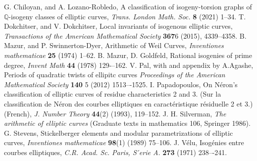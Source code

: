 \documentclass{ws-ijnt}
\newcommand{\Q}{\mathbb Q}
\begin{document}
\begin{thebibliography}{99}
 G. Chiloyan, and A. Lozano-Robledo, A classification of isogeny-torsion graphs of 
{$\Q$}-isogeny classes of elliptic curves, 
{\it Trans. London Math. Soc.} 
{\bf 8} (2021) 1--34.
T. Dokchitser, and V. Dokchitser,
Local invariants of isogenous elliptic curves,
{\it Transactions of the American Mathematical Society} {\bf 367}6 (2015), 4339--4358.
 B. Mazur, and P. Swinnerton-Dyer, 
Arithmetic of Weil Curves, {\it  Inventiones mathematicae} {\bf 25} (1974) 1--62.
B. Mazur, D. Goldfeld, 
Rational isogenies of prime degree, {\it Invent Math} 
{\bf 44} (1978) 129-–162. 
V. Pal, with and appendix by A.Agashe,
Periods of quadratic twists of ellipitc curves
{\it Proceedings of the American Mathematical Society} {\bf 140} 5 (2012) 1513–-1525.
I. Papadopoulos, 
On Néron’s classification of elliptic curves of residue characteristics 2 and 3. (Sur la classification de Néron des courbes elliptiques en caractéristique résiduelle 2 et 3.) (French),
{\it J. Number Theory} 
{\bf 44}(2)
(1993), 119--152.
J. H. Silverman,
{\it The arithmetic of elliptic curves} (Graduate texts in mathematics 106, Springer 1986).
G. Stevens, 
Stickelberger elements and modular parametrizations of elliptic curves, {\it Inventiones mathematicae} {\bf 98}(1) (1989) 
75--106. 
J. Vélu, Isogénies entre courbes elliptiques, 
{\it C.R. Acad. Sc. Paris, S ́erie A.} {\bf 273}
(1971)
238–-241.
\end{thebibliography}
\end{document}
